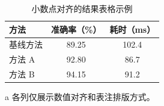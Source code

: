 \begin{table}[htbp]
  \centering
  \begin{threeparttable}
    \caption{小数点对齐的结果表格示例}
    \label{tab:numeric-results}
    \begin{tabular}{l S[table-format=2.2] S[table-format=3.1]}
      \toprule
      方法 & {准确率（\%）} & {耗时（\unit{\milli\second}）} \\
      \midrule
      基线方法 & 89.25 & 102.4 \\
      方法 A & 92.80 & 86.7 \\
      方法 B & 94.15 & 91.2 \\
      \bottomrule
    \end{tabular}
    \begin{tablenotes}
      \item[a] 各列仅展示数值对齐和表注排版方式。
    \end{tablenotes}
  \end{threeparttable}
\end{table}
